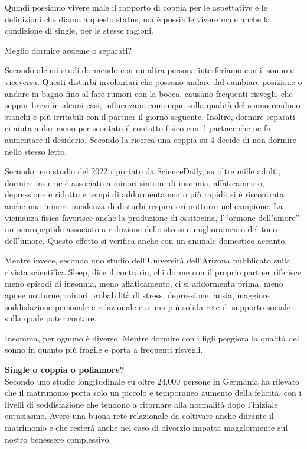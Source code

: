 \documentclass[12pt]{book} %
\begin{document}
Quindi possiamo vivere male il rapporto di coppia per le aspettative e le definizioni che diamo a questo status, ma è
possibile vivere male anche la condizione di single, per le stesse ragioni.

\begin{mdframed}[linewidth=1pt]
Meglio dormire assieme o separati? 

Secondo alcuni studi dormendo con un altra persona interferiamo con il sonno e viceversa. Questi
disturbi involontari che possono andare dal cambiare posizione o andare in bagno fino al fare rumori con la bocca,
causano frequenti risvegli, che seppur brevi in alcuni casi, influenzano comunque sulla qualità del sonno rendono
stanchi e più irritabili con il partner il giorno seguente. Inoltre, dormire separati ci aiuta a dar meno per scontato
il contatto fisico con il partner che ne fa aumentare il desiderio. Secondo la ricerca una coppia su 4 decide di non
dormire nello stesso letto.

Secondo uno studio del 2022 riportato da ScienceDaily, su oltre mille adulti, dormire insieme è associato a minori sintomi di insonnia, affaticamento, depressione e ridotto e tempi di addormentamento più rapidi; si è riscontrata anche una minore incidenza di disturbi respiratori notturni nel campione. La vicinanza fisica favorisce anche la produzione di ossitocina, l'“ormone dell'amore” un neuropeptide associato a riduzione dello stress e miglioramento del tono dell’umore. Questo effetto si verifica anche con un animale domestico accanto.

Mentre invece, secondo uno studio dell'Università dell'Arizona pubblicato sulla rivista scientifica
Sleep, dice il contrario, chi
dorme con il proprio partner riferisce meno episodi di insonnia, meno affaticamento, ci si addormenta prima, meno apnee
notturne, minori probabilità di stress, depressione, ansia, maggiore soddisfazione personale e relazionale e a una più
solida rete di supporto sociale sulla quale poter contare. 

Insomma, per ognuno è diverso. Mentre dormire con i figli peggiora la qualità del sonno in quanto più fragile e porta a frequenti risvegli.
\end{mdframed}

\noindent \textbf{\large Single o coppia o poliamore?} \\
Secondo uno studio longitudinale su oltre 24.000 persone in Germania ha rilevato che il matrimonio porta solo un piccolo e temporaneo aumento della felicità, con i livelli di soddisfazione che tendono a ritornare alla normalità dopo l'iniziale entusiasmo. Avere una buona rete relazionale da coltivare anche durante il matrimonio e che resterà anche nel caso di divorzio impatta maggiormente sul nostro benessere complessivo.
\end{document}
